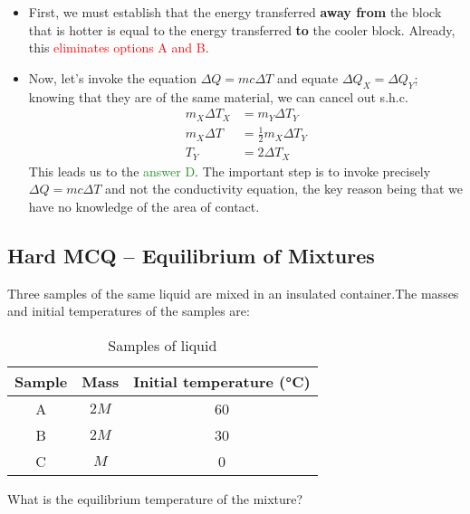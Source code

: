 \documentclass[a4paper,12pt]{article}
\begin{document}
\begin{itemize}
  \item First, we must establish that the energy transferred \textbf{away from} the block that is hotter is equal to the energy transferred \textbf{to} the cooler block. Already, this \textcolor{red}{eliminates options A and B}.
  \item Now, let's invoke the equation $\Delta Q = mc\Delta T$ and equate $\Delta Q_X = \Delta Q_Y$; knowing that they are of the same material, we can cancel out s.h.c.
        \begin{align*}
          m_X\Delta T_X & = m_Y\Delta T_Y            \\
          m_X\Delta T   & = \frac{1}{2}m_X\Delta T_Y \\
          T_Y           & = 2\Delta T_X
        \end{align*}
        This leads us to the \textcolor{ForestGreen}{answer D}. The important step is to invoke precisely $\Delta Q = mc\Delta T$ and not the conductivity equation, the key reason being that we have no knowledge of the area of contact.
\end{itemize}

\pagebreak

\subsection{Hard MCQ -- Equilibrium of Mixtures}

Three samples of the same liquid are mixed in an insulated container.The masses and initial temperatures of the samples are:

\begin{table}[H]
  \centering
  \begin{tabular}{|c|c|c|}
    \hline
    \textbf{Sample} & \textbf{Mass} & \textbf{Initial temperature (°C)} \\ \hline
    A               & $2M$          & 60                                \\ \hline
    B               & $2M$          & 30                                \\ \hline
    C               & $M$           & 0                                 \\ \hline
  \end{tabular}
  \caption{Samples of liquid}
  \label{tab:liquid_samples}
\end{table}

What is the equilibrium temperature of the mixture?
\end{document}
